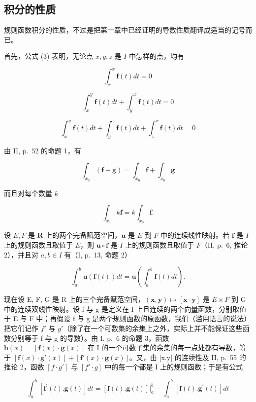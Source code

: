 \subsection{积分的性质}

规则函数积分的性质，不过是把第一章中已经证明的导数性质翻译成适当的记号而已。

首先，公式 (3) 表明，无论点 \(x, y, z\) 是 \(I\) 中怎样的点，均有

\[
\int_ {x} ^ {x} \mathbf {f} (t) d t = 0\tag{4}
\]

\[
\int_ {x} ^ {y} \mathbf {f} (t) d t + \int_ {y} ^ {x} \mathbf {f} (t) d t = 0\tag{5}
\]

\[
\int_ {x} ^ {y} \mathbf {f} (t) d t + \int_ {y} ^ {z} \mathbf {f} (t) d t + \int_ {z} ^ {x} \mathbf {f} (t) d t = 0\tag{6}
\]

由 II, p.~52 的命题 1，有

\[
\int_ {x _ {0}} (\mathbf {f} + \mathbf {g}) = \int_ {x _ {0}} \mathbf {f} + \int_ {x _ {0}} \mathbf {g}\tag{7}
\]

而且对每个数量 \(k\)

\[
\int_ {x _ {0}} k \mathbf {f} = k \int_ {x _ {0}} \mathbf {f}.\tag{8}
\]

设 \(E, F\) 是 \(\mathbf{R}\) 上的两个完备赋范空间，\(\mathbf{u}\) 是 \(E\) 到 \(F\) 中的连续线性映射。若 \(\mathbf{f}\) 是 \(I\) 上的规则函数且取值于 \(E\)，则 \(\mathbf{u} \circ \mathbf{f}\) 是 \(I\) 上的规则函数且取值于 \(F\)（II, p.~6, 推论 2），并且对 \(a, b \in I\) 有（I, p.~13, 命题 2）

\[
\int_ {a} ^ {b} \mathbf {u} (\mathbf {f} (t)) d t = \mathbf {u} \left(\int_ {a} ^ {b} \mathbf {f} (t) d t\right).\tag{9}
\]

现在设 E, F, G 是 R 上的三个完备赋范空间，\((\mathbf{x}, \mathbf{y}) \mapsto [\mathbf{x} \cdot \mathbf{y}]\) 是 \(E \times F\) 到 G 中的连续双线性映射。设 f 与 g 是定义在 I 上且连续的两个向量函数，分别取值于 E 与 F 中；再假设 f 与 g 是两个规则函数的原函数，我们（滥用语言的说法）把它们记作 \(f'\) 与 \(g'\)（除了在一个可数集的余集上之外，实际上并不能保证这些函数分别等于 f 与 g 的导数）。由 I, p.~6 的命题 3，函数 \(\mathbf{h}(x) = [\mathbf{f}(x) \cdot \mathbf{g}(x)]\) 在 I 的一个可数子集的余集的每一点处都有导数，等于 \([\mathbf{f}(x) \cdot \mathbf{g}'(x)] + [\mathbf{f}'(x) \cdot \mathbf{g}(x)]\)。又，由 {[}x.y{]} 的连续性及 II, p.~55 的推论 2，函数 \([f \cdot g']\) 与 \([f' \cdot g]\) 中的每一个都是 I 上的规则函数；于是有公式

\[
\int_ {a} ^ {b} [ \mathbf {f} ^ {\prime} (t). \mathbf {g} (t) ] d t = [ \mathbf {f} (t). \mathbf {g} (t) ] \big | _ {a} ^ {b} - \int_ {a} ^ {b} [ \mathbf {f} (t). \mathbf {g} ^ {\prime} (t) ] d t\tag{10}
\]

